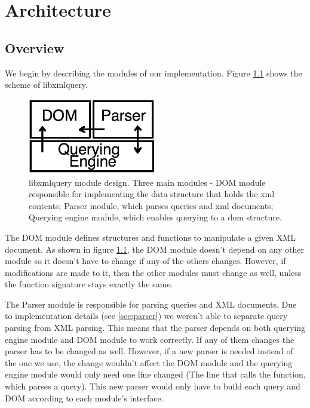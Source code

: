 \documentclass[a4paper]{report}
\begin{document}
\chapter{Architecture}\label{chap:arch}
\section{Overview}\label{sec:overview}
	We begin by describing the modules of our implementation. Figure \ref{fig:arch} shows the scheme of libxmlquery. 

	 \begin{figure}[h!]
		\centering
		\label{fig:arch}
		\includegraphics[width=0.5\textwidth] {arch}
		\caption{libxmlquery module design. Three main modules - DOM module responsible for implementing the data structure that holds the xml contents; Parser module, which parses queries and xml documents; 
		Querying engine module, which enables querying to a dom structure.}
	 \end{figure}
	 
	The DOM module defines structures and functions to manipulate a given XML document. As shown in figure \ref{fig:arch}, the DOM module doesn't depend on any other module so it doesn't have to change if any of the 
	others changes. However, if modifications are made to it, then the other modules must change as well, unless the function signature stays exactly the same.
	
	The Parser module is responsible for parsing queries and XML documents. Due to implementation details (see \ref{sec:parser}) we weren't able to separate query parsing from XML parsing. This means that the parser 		depends on both querying engine module and DOM module to work correctly. If any of them changes the parser has to be changed as well. However, if a new parser is needed instead of the one we use, the
	change wouldn't affect the DOM module and the querying engine module would only need one line changed (The line that calls the function, which parses a query). This new parser would only have to build each query 
	and DOM according to each module's interface.
	
\end{document}
